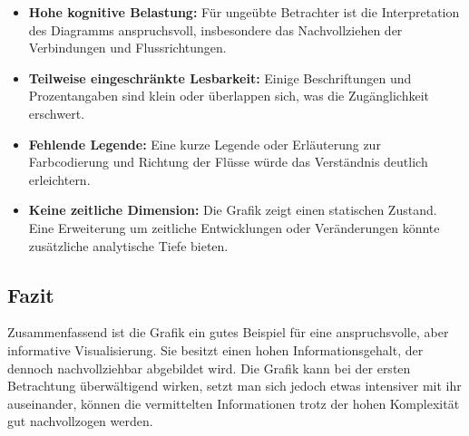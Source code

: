 \documentclass[a4paper,12pt]{article}
\begin{document}
\begin{itemize}[label=--]
    \item \textbf{Hohe kognitive Belastung:} 
    Für ungeübte Betrachter ist die Interpretation des Diagramms anspruchsvoll, insbesondere das Nachvollziehen der Verbindungen und Flussrichtungen.
    
    \item \textbf{Teilweise eingeschränkte Lesbarkeit:} 
    Einige Beschriftungen und Prozentangaben sind klein oder überlappen sich, was die Zugänglichkeit erschwert.
    
    \item \textbf{Fehlende Legende:} 
    Eine kurze Legende oder Erläuterung zur Farbcodierung und Richtung der Flüsse würde das Verständnis deutlich erleichtern.
    
    \item \textbf{Keine zeitliche Dimension:} 
    Die Grafik zeigt einen statischen Zustand. 
    Eine Erweiterung um zeitliche Entwicklungen oder Veränderungen könnte zusätzliche analytische Tiefe bieten.
\end{itemize}

\subsection{Fazit}
Zusammenfassend ist die Grafik ein gutes Beispiel für eine anspruchsvolle, aber informative Visualisierung. 
Sie besitzt einen hohen Informationsgehalt, der dennoch nachvollziehbar abgebildet wird.
Die Grafik kann bei der ersten Betrachtung überwältigend wirken, setzt man sich jedoch etwas intensiver mit ihr auseinander, können die vermittelten Informationen trotz 
der hohen Komplexität gut nachvollzogen werden.
\end{document}
